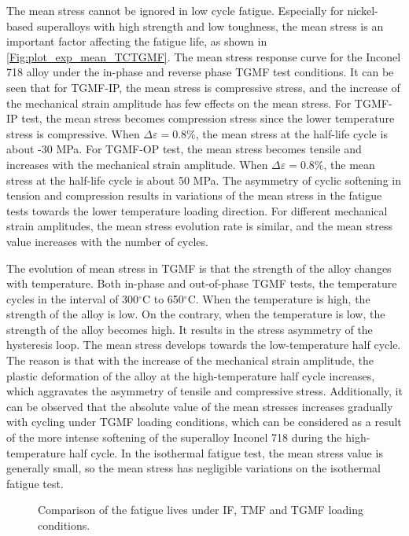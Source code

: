 \documentclass[preprint,5p,twocolumn,10pt,sort&compress]{elsarticle}
\begin{document}
The mean stress cannot be ignored in low cycle fatigue. Especially for nickel-based superalloys with high strength and low toughness, the mean stress is an important factor affecting the fatigue life, as shown in \autoref{Fig:plot_exp_mean_TCTGMF}. The mean stress response curve for the Inconel 718 alloy under the in-phase and reverse phase TGMF test conditions. It can be seen that for TGMF-IP, the mean stress is compressive stress, and the increase of the mechanical strain amplitude has few effects on the mean stress. For TGMF-IP test, the mean stress becomes compression stress since the lower temperature stress is compressive. When $\Delta \varepsilon=0.8\%$, the mean stress at the half-life cycle is about -30 MPa. For TGMF-OP test, the mean stress becomes tensile and increases with the mechanical strain amplitude.
When $\Delta \varepsilon=0.8\%$, the mean stress at the half-life cycle is about 50 MPa. The asymmetry of cyclic softening in tension and compression results in variations of the mean stress in the fatigue tests towards the lower temperature loading direction. For different mechanical strain amplitudes, the mean stress evolution rate is similar, and the mean stress value increases with the number of cycles.

The evolution of mean stress in TGMF is that the strength of the alloy changes with temperature. Both in-phase and out-of-phase TGMF tests, the temperature cycles in the interval of 300$^\circ$C to 650$^\circ$C. When the temperature is high, the strength of the alloy is low. On the contrary, when the temperature is low, the strength of the alloy becomes high. It results in the stress asymmetry of the hysteresis loop. The mean stress develops towards the low-temperature half cycle.
The reason is that with the increase of the mechanical strain amplitude, the plastic deformation of the alloy at the high-temperature half cycle increases, which aggravates the asymmetry of tensile and compressive stress.
Additionally, it can be observed that the absolute value of the mean stresses increases gradually with cycling under TGMF loading conditions, which can be considered as a result of the more intense softening of the superalloy Inconel 718 during the high-temperature half cycle. In the isothermal fatigue test, the mean stress value is generally small, so the mean stress has negligible variations on the isothermal fatigue test.

\begin{figure}[!ht]
\caption{Comparison of the fatigue lives under IF, TMF and TGMF loading conditions.}
\label{Fig:plot_exp_fatigue_life_TGMF}
\end{figure}
\end{document}
